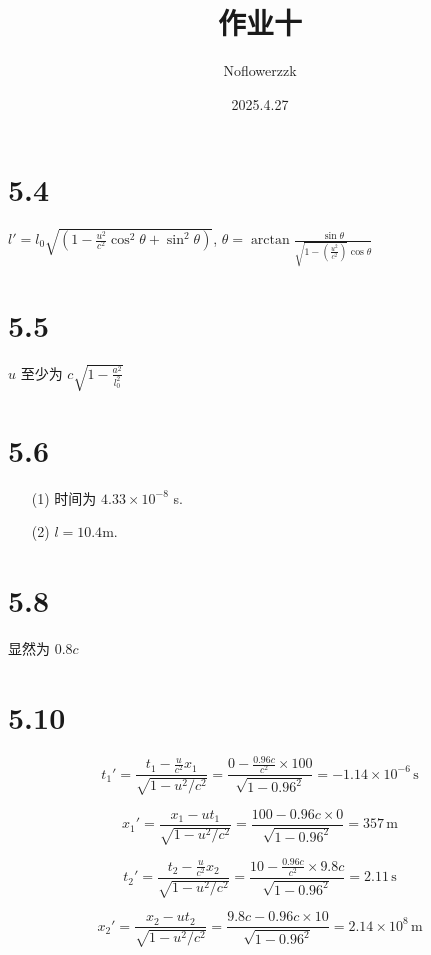 \documentclass{article}
\title{作业十}
\author{Noflowerzzk}
\date{2025.4.27}
\begin{document}
\maketitle

\section*{5.4}

$l' = l_0\sqrt{\left(1 - \frac{u^2}{c^2}\cos^2 \theta + \sin^2 \theta\right)}$, $\theta = \arctan \frac{\sin \theta}{\sqrt{1 - \left(\frac{u^2}{c^2}\right)}\cos \theta}$

\section*{5.5}

$u$ 至少为 $c\sqrt{1 - \frac{a^2}{l_0^2}}$

\section*{5.6}

\begin{itemize}
    \item [(1)] 时间为 $4.33 \times 10^{-8}$ s.
    \item [(2)] $l = 10.4$m.
\end{itemize}

\section*{5.8}

显然为 $0.8c$

\section*{5.10}

\[t_1' = \frac{t_1 - \frac{u}{c^2} x_1}{\sqrt{1 - u^2 / c^2}} = \frac{0 - \frac{0.96c}{c^2} \times 100}{\sqrt{1 - 0.96^2}} = -1.14 \times 10^{-6} \, \text{s}\]

\[x_1' = \frac{x_1 - ut_1}{\sqrt{1 - u^2 / c^2}} = \frac{100 - 0.96c \times 0}{\sqrt{1 - 0.96^2}} = 357 \, \text{m}\]

\[t_2' = \frac{t_2 - \frac{u}{c^2} x_2}{\sqrt{1 - u^2 / c^2}} = \frac{10 - \frac{0.96c}{c^2} \times 9.8c}{\sqrt{1 - 0.96^2}} = 2.11 \, \text{s}\]

\[x_2' = \frac{x_2 - ut_2}{\sqrt{1 - u^2 / c^2}} = \frac{9.8c - 0.96c \times 10}{\sqrt{1 - 0.96^2}} = 2.14 \times 10^8 \, \text{m}\]
\end{document}
